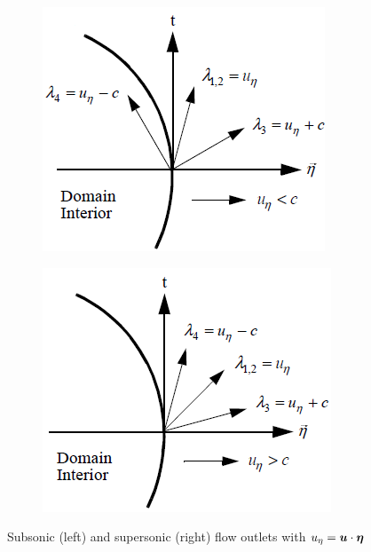 %
%
\begin{figure}[H]
        \centering
        \begin{subfigure}[b]{0.495\textwidth}
                \centering
                \includegraphics[width=\textwidth]{figures/sub_exit_bc.png}
                \caption{\label{fig:sub_flow_outlet}}
        \end{subfigure}%
        \begin{subfigure}[b]{0.495\textwidth}
                \centering
                \includegraphics[width=\textwidth]{figures/sup_exit_bc.png}
                \caption{\label{fig:sup_flow_outlet}}
        \end{subfigure}
        \caption{Subsonic (left) and supersonic (right) flow outlets\label{fig:outlet_sct3} with $u_\eta = \boldsymbol u \cdot \boldsymbol\eta$ \cite{RichThesis}}
\end{figure}
